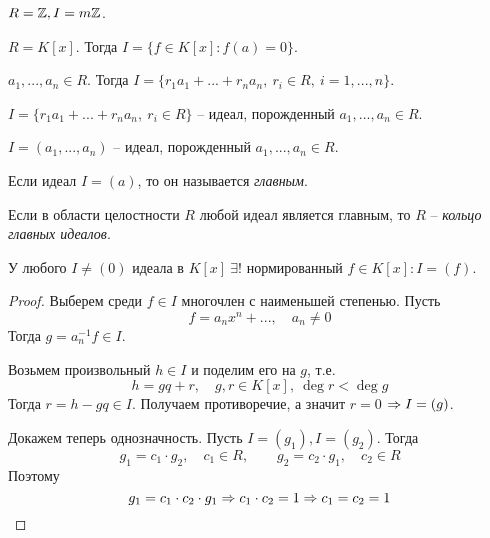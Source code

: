 \begin{Example}
	$R = \mathbb{Z}, I = m\mathbb{Z}$. 
\end{Example}

\begin{Example}
	$R = K[x]$. Тогда $I = \{f \in K[x] : f(a) = 0\}$. 
\end{Example}

\begin{Example}
	$a_1, ..., a_n \in R$. Тогда $I = \{r_1 a_1 + ... + r_n a_n, \ r_i \in R, \ i = 1, ..., n\}$.
\end{Example}

\begin{Def}
	$I = \{r_1 a_1 + ... + r_n a_n, \ r_i \in R\}$ -- идеал, порожденный $a_1, ..., a_n \in R$. 
\end{Def}

\begin{notation}
	$I = (a_1, ..., a_n)$ -- идеал, порожденный $a_1, ..., a_n \in R$.
\end{notation}

\begin{Def}
	Если идеал $I = (a)$, то он называется \textit{главным}.
\end{Def}

\begin{Def}
	Если в области целостности $R$ любой идеал является главным, то $R$ -- \textit{кольцо главных идеалов}.
\end{Def}

\begin{Thm}
	У любого $I \neq (0)$ идеала в $K[x] \ \exists !$ нормированный $f \in K[x] : I = (f)$. 
\end{Thm}

\begin{proof}
	Выберем среди $f \in I$ многочлен с наименьшей степенью. Пусть
	\[f = a_n x^n + ..., \quad a_n \neq 0\]
	Тогда $g = a_n^{-1} f \in I$. 
	
	Возьмем произвольный $h \in I$ и поделим его на $g$, т.е. 
	\[h = gq + r, \quad g, r \in K[x], \ \deg r < \deg g\] 
	Тогда $r = h - gq \in I$. Получаем противоречие, а значит $r = 0$ $\Rightarrow I = (g)$. 
	
	Докажем теперь однозначность.
	Пусть $I = (g_1), I = (g_2)$. Тогда
	\[g_1 = c_1 \cdot g_2, \quad c_1 \in R, \qquad g_2 = c_2 \cdot g_1, \quad c_2 \in R\]
	Поэтому
	\[g_1 = c_1 \cdot c_2 \cdot g_1 \Rightarrow c_1 \cdot c_2 = 1 \Rightarrow c_1 = c_2 = 1\]
\end{proof}

